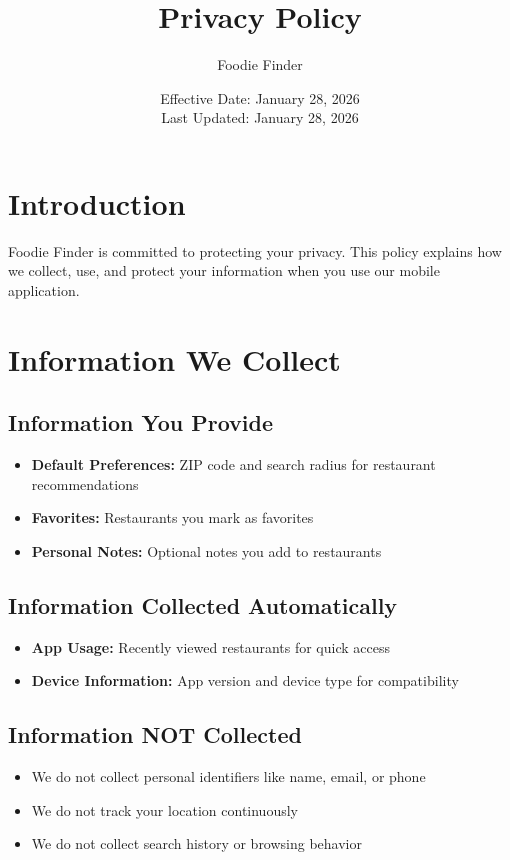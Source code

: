 \documentclass[11pt,letterpaper]{article}
\title{\textbf{Privacy Policy}}
\author{Foodie Finder}
\date{Effective Date: January 28, 2026 \\ Last Updated: January 28, 2026}
\begin{document}
\maketitle
\thispagestyle{empty}

\section{Introduction}

Foodie Finder is committed to protecting your privacy. This policy explains how we collect, use, and protect your information when you use our mobile application.

\section{Information We Collect}

\subsection{Information You Provide}
\begin{itemize}
    \item \textbf{Default Preferences:} ZIP code and search radius for restaurant recommendations
    \item \textbf{Favorites:} Restaurants you mark as favorites
    \item \textbf{Personal Notes:} Optional notes you add to restaurants
\end{itemize}

\subsection{Information Collected Automatically}
\begin{itemize}
    \item \textbf{App Usage:} Recently viewed restaurants for quick access
    \item \textbf{Device Information:} App version and device type for compatibility
\end{itemize}

\subsection{Information NOT Collected}
\begin{itemize}
    \item We do not collect personal identifiers like name, email, or phone
    \item We do not track your location continuously
    \item We do not collect search history or browsing behavior
\end{itemize}
\end{document}
